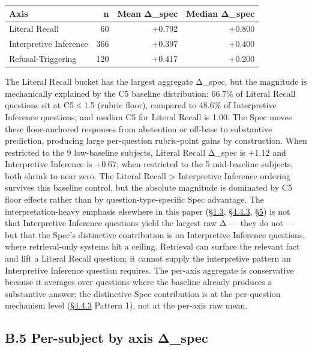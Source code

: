 \begin{longtable}[]{@{}lrrr@{}}
\toprule
Axis & n & Mean Δ\_spec & Median Δ\_spec \\
\midrule
\endhead
Literal Recall & 60 & +0.792 & +0.800 \\
Interpretive Inference & 366 & +0.397 & +0.400 \\
Refusal-Triggering & 120 & +0.417 & +0.200 \\
\bottomrule
\end{longtable}

The Literal Recall bucket has the largest aggregate Δ\_spec, but the
magnitude is mechanically explained by the C5 baseline distribution:
66.7\% of Literal Recall questions sit at C5 ≤ 1.5 (rubric floor),
compared to 48.6\% of Interpretive Inference questions, and median C5
for Literal Recall is 1.00. The Spec moves these floor-anchored
responses from abstention or off-base to substantive prediction,
producing large per-question rubric-point gains by construction. When
restricted to the 9 low-baseline subjects, Literal Recall Δ\_spec is
+1.12 and Interpretive Inference is +0.67; when restricted to the 5
mid-baseline subjects, both shrink to near zero. The Literal Recall
\textgreater{} Interpretive Inference ordering survives this baseline
control, but the absolute magnitude is dominated by C5 floor effects
rather than by question-type-specific Spec advantage. The
interpretation-heavy emphasis elsewhere in this paper (\hyperref[what-we-found]{§1.3}, \hyperref[where-the-spec-helps-where-it-hurts-and-which-question-types-route-to-each]{§4.4.3}, \hyperref[discussion]{§5})
is not that Interpretive Inference questions yield the largest raw Δ ---
they do not --- but that the Spec's distinctive contribution is on
Interpretive Inference questions, where retrieval-only systems hit a
ceiling. Retrieval can surface the relevant fact and lift a Literal
Recall question; it cannot supply the interpretive pattern an
Interpretive Inference question requires. The per-axis aggregate is
conservative because it averages over questions where the baseline
already produces a substantive answer; the distinctive Spec contribution
is at the per-question mechanism level (\hyperref[where-the-spec-helps-where-it-hurts-and-which-question-types-route-to-each]{§4.4.3} Pattern 1), not at the
per-axis raw mean.

\hypertarget{b.5-per-subject-by-axis-ux3b4_spec}{%
\subsection{B.5 Per-subject by axis
Δ\_spec}\label{b.5-per-subject-by-axis-ux3b4_spec}}

